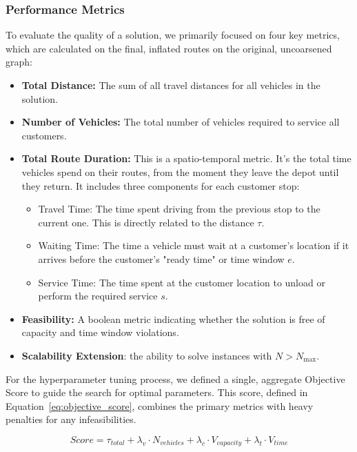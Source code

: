 \documentclass[conference]{IEEEtran}
\begin{document}
\subsubsection{Performance Metrics}
To evaluate the quality of a solution, we primarily focused on four key metrics, which are calculated on the final, inflated routes on the original, uncoarsened graph:
\begin{itemize}
  \item \textbf{Total Distance:} The sum of all travel distances for all vehicles in the solution.
  \item \textbf{Number of Vehicles:} The total number of vehicles required to service all customers.
  \item \textbf{Total Route Duration:} This is a spatio-temporal metric. It's the total time  vehicles spend on their routes, from the moment they leave the depot until they return. It includes three components for each customer stop:
\begin{itemize}
\item Travel Time: The time spent driving from the previous stop to the current one. This is directly related to the distance $\tau$.

 \item Waiting Time: The time a vehicle must wait at a customer's location if it arrives before the customer's "ready time" or time window $e$.

\item Service Time: The time spent at the customer location to unload or perform the required service $s$.
\end{itemize}
  \item \textbf{Feasibility:} A boolean metric indicating whether the solution is free of capacity and time window violations.


    \item \textbf{Scalability Extension}: the ability to solve instances with $N > N_{\max}$.

  
\end{itemize}

For the hyperparameter tuning process, we defined a single, aggregate Objective Score to guide the search for optimal parameters. This score, defined in Equation~\ref{eq:objective_score}, combines the primary metrics with heavy penalties for any infeasibilities.

\begin{equation}
\label{eq:objective_score}
Score = \tau_{total} + \lambda_{v} \cdot N_{vehicles} + \lambda_{c} \cdot V_{capacity} + \lambda_{t} \cdot V_{time}
\end{equation}
\end{document}
